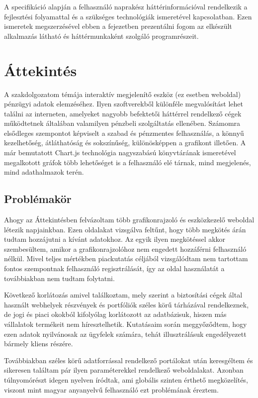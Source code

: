 
A specifikáció alapján a felhasználó naprakész háttérinformációval rendelkezik a fejlesztési folyamattal és a szükséges technológiák ismeretével kapcsolatban. Ezen ismeretek megszerzésével ebben a fejezetben prezentálni fogom az elkészült alkalmazás látható és háttérmunkaként szolgáló programrészeit.


\section{Áttekintés}

A szakdolgozatom témája interaktív megjelenítő eszköz (ez esetben weboldal) pénzügyi adatok elemzéséhez. Ilyen szoftverekből különféle megvalósítást lehet találni az interneten, amelyeket nagyobb befektetői háttérrel rendelkező cégek működtetnek általában valamilyen pénzbeli szolgáltatás ellenében. Számomra elsődleges szempontot képviselt a szabad és pénzmentes felhasználás, a könnyű kezelhetőség, átláthatóság és sokszínűség, különösképpen a grafikont illetően. A már bemutatott Chart.js technológia nagyszabású könyvtárának ismeretével megalkotott gráfok több lehetőséget is a felhasználó elé tárnak, mind megjelenés, mind adathalmazok terén. 

\subsection{Problémakör}

Ahogy az Áttekintésben felvázoltam több grafikonrajzoló és eszközkezelő weboldal létezik napjainkban. Ezen oldalakat vizsgálva feltűnt, hogy több megkötés árán tudtam hozzájutni a kívánt adatokhoz. Az egyik ilyen megkötéssel akkor szembesültem, amikor a grafikonrajzolóhoz nem engedett hozzáférni felhasználó nélkül. Mivel teljes mértékben piackutatás céljából vizsgálódtam nem tartottam fontos szempontnak felhasználó regisztrálását, így az oldal használatát a továbbiakban nem tudtam folytatni.

	Következő korlátozás amivel találkoztam, mely szerint a biztosítási cégek által használt webhelyek részvények és portfóliók széles körű tárházával rendelkeznek, de jogi és piaci okokból kifolyólag korlátozott az adatbázisuk, hiszen más vállalatok termékeit nem híresztelhetik. Kutatásaim során meggyőződtem, hogy ezen adatok nyilvánosak az ügyfelek számára, tehát illusztrálásuk engedélyezett bármely kliens részére.

	Továbbiakban széles körű adatforrással rendelkező portálokat után keresgéltem és sikeresen találtam pár ilyen paraméterekkel rendelkező weboldalakat. Azonban túlnyomórészt idegen nyelven íródtak, ami globális szinten érthető megközelítés, viszont mint magyar anyanyelvű felhasználó ezt problémának éreztem. 


